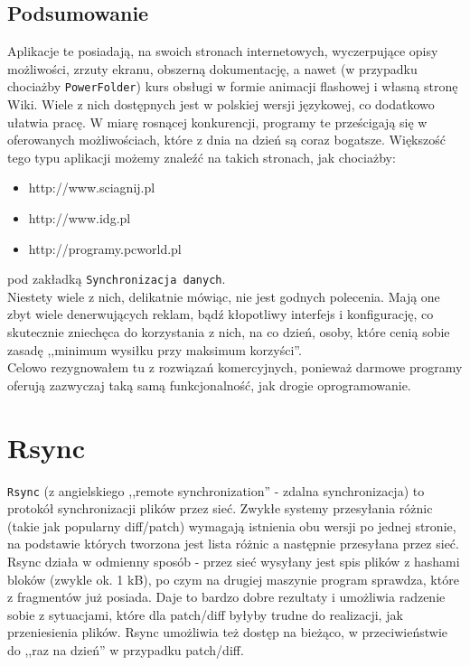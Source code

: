 \subsection{Podsumowanie}
Aplikacje te posiadają, na swoich stronach internetowych, wyczerpujące opisy możliwości, zrzuty ekranu, obszerną dokumentację, a nawet (w przypadku chociażby \verb|PowerFolder|) kurs obsługi w formie animacji flashowej i własną stronę Wiki. Wiele z nich dostępnych jest w polskiej wersji językowej, co dodatkowo ułatwia pracę. W miarę rosnącej konkurencji, programy te prześcigają się w oferowanych możliwościach, które z dnia na dzień są coraz bogatsze. 
Większość tego typu aplikacji możemy znaleźć na takich stronach, jak chociażby:
\begin{itemize}
\item http://www.sciagnij.pl
\item http://www.idg.pl
\item http://programy.pcworld.pl
\end{itemize}
pod zakładką \verb|Synchronizacja danych|. \\

Niestety wiele z nich, delikatnie mówiąc, nie jest godnych polecenia. Mają one zbyt wiele denerwujących reklam, bądź kłopotliwy interfejs i konfigurację, co skutecznie zniechęca do korzystania z nich, na co dzień, osoby, które cenią sobie zasadę ,,minimum wysiłku przy maksimum korzyści''. \\
Celowo rezygnowałem tu z rozwiązań komercyjnych, ponieważ darmowe programy oferują zazwyczaj taką samą funkcjonalność, jak drogie oprogramowanie.

\section{Rsync}
\label{rsyncskladnia}
\verb|Rsync| (z angielskiego ,,remote synchronization'' - zdalna synchronizacja) to protokół synchronizacji plików przez sieć. Zwykłe systemy przesyłania różnic (takie jak popularny diff/patch) wymagają istnienia obu wersji po jednej stronie, na podstawie których tworzona jest lista różnic a następnie przesyłana przez sieć. Rsync działa w odmienny sposób - przez sieć wysyłany jest spis plików z hashami bloków (zwykle ok. 1 kB), po czym na drugiej maszynie program sprawdza, które z fragmentów już posiada. Daje to bardzo dobre rezultaty i umożliwia radzenie sobie z sytuacjami, które dla patch/diff byłyby trudne do realizacji, jak przeniesienia plików.
Rsync umożliwia też dostęp na bieżąco, w przeciwieństwie do ,,raz na dzień'' w przypadku patch/diff.\cite{5}
